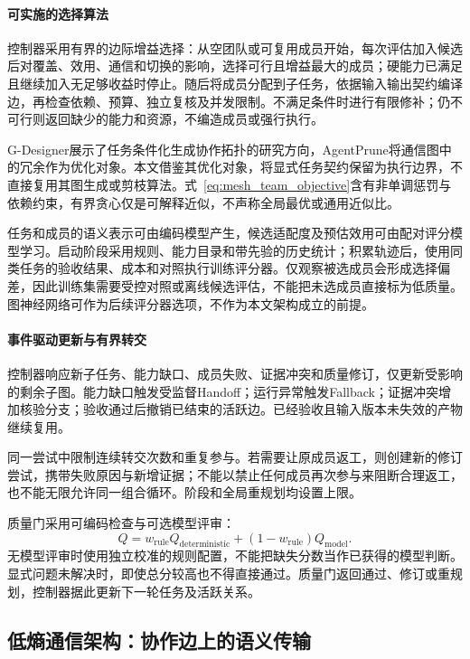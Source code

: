 \paragraph{可实施的选择算法}
控制器采用有界的边际增益选择：从空团队或可复用成员开始，每次评估加入候选后对覆盖、效用、通信和切换的影响，选择可行且增益最大的成员；硬能力已满足且继续加入无足够收益时停止。随后将成员分配到子任务，依据输入输出契约编译边，再检查依赖、预算、独立复核及并发限制。不满足条件时进行有限修补；仍不可行则返回缺少的能力和资源，不编造成员或强行执行。

G-Designer展示了任务条件化生成协作拓扑的研究方向\cite{tide_gdesigner}，AgentPrune将通信图中的冗余作为优化对象\cite{tide_agentprune}。本文借鉴其优化对象，将显式任务契约保留为执行边界，不直接复用其图生成或剪枝算法。式~\eqref{eq:mesh_team_objective}含有非单调惩罚与依赖约束，有界贪心仅是可解释近似，不声称全局最优或通用近似比。

任务和成员的语义表示可由编码模型产生，候选适配度及预估效用可由配对评分模型学习。启动阶段采用规则、能力目录和带先验的历史统计；积累轨迹后，使用同类任务的验收结果、成本和对照执行训练评分器。仅观察被选成员会形成选择偏差，因此训练集需要受控对照或离线候选评估，不能把未选成员直接标为低质量。图神经网络可作为后续评分器选项，不作为本文架构成立的前提。

\paragraph{事件驱动更新与有界转交}
控制器响应新子任务、能力缺口、成员失败、证据冲突和质量修订，仅更新受影响的剩余子图。能力缺口触发受监督Handoff；运行异常触发Fallback；证据冲突增加核验分支；验收通过后撤销已结束的活跃边。已经验收且输入版本未失效的产物继续复用。

同一尝试中限制连续转交次数和重复参与。若需要让原成员返工，则创建新的修订尝试，携带失败原因与新增证据；不能以禁止任何成员再次参与来阻断合理返工，也不能无限允许同一组合循环。阶段和全局重规划均设置上限。

质量门采用可编码检查与可选模型评审：
\begin{equation}
Q=w_{\mathrm{rule}}Q_{\mathrm{deterministic}}
+(1-w_{\mathrm{rule}})Q_{\mathrm{model}}.
\label{eq:mesh_quality}
\end{equation}
无模型评审时使用独立校准的规则配置，不能把缺失分数当作已获得的模型判断。显式问题未解决时，即使总分较高也不得直接通过。质量门返回通过、修订或重规划，控制器据此更新下一轮任务及活跃关系。

\subsection{低熵通信架构：协作边上的语义传输}

